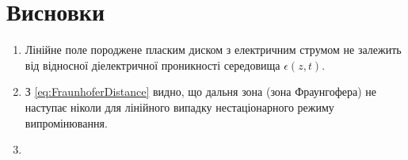 \chapter*{Висновки}

\begin{enumerate}
%
\item Лінійне поле породжене пласким диском з електричним струмом не залежить 
від відносної діелектричної проникності середовища $ \epsilon(z,t) $.
%
\item З \eqref{eq:FraunhoferDistance} видно, що дальня зона (зона Фраунгофера) не 
наступає ніколи для лінійного випадку нестаціонарного режиму випромінювання.
%
\item 
%
\end{enumerate}
%

